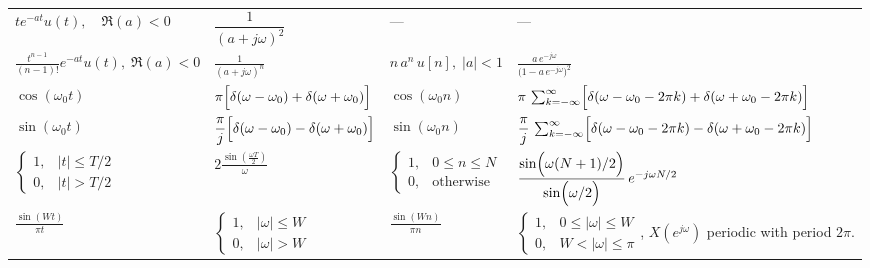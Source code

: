 \documentclass{article}
\begin{document}
\begin{multicols}{2}
\begin{table*}[ht]
\begin{tabular}{@{}llll@{}}
            $t e^{-at} u(t),\quad \Re(a)<0$                                & $\dfrac{1}{(a+j\omega)^2}$                                                    & ---                                                                     & ---                                                                                                                                 \\ [1mm]
            $\frac{t^{n-1}}{(n-1)!}e^{-a t}u(t),\;\Re(a)<0$                & $\frac{1}{(a + j\omega)^n}$                                                   & $n\,a^n\,u[n],\;|a|<1$                                                  & $\frac{a\,e^{-j\omega}}{\bigl(1 - a\,e^{-j\omega}\bigr)^2}$                                                                         \\ [1mm]
            $\cos(\omega_0 t)$                                             & $\pi\Bigl[\delta(\omega-\omega_0) + \delta(\omega+\omega_0)\Bigr]$            & $\cos(\omega_0 n)$                                                      & $\pi\,\sum_{k=-\infty}^{\infty}\Bigl[\delta(\omega-\omega_0-2\pi k) + \delta(\omega+\omega_0-2\pi k)\Bigr]$                         \\ [1mm]
            $\sin(\omega_0 t)$                                             & $\dfrac{\pi}{j}\Bigl[\delta(\omega-\omega_0) - \delta(\omega+\omega_0)\Bigr]$ & $\sin(\omega_0 n)$                                                      & $\dfrac{\pi}{j}\,\sum_{k=-\infty}^{\infty}\Bigl[\delta(\omega-\omega_0-2\pi k) - \delta(\omega+\omega_0-2\pi k)\Bigr]$              \\ [1mm]
            $\begin{cases} 1, & |t| \le T/2 \\ 0, & |t| > T/2 \end{cases}$ & $2\frac{\sin\left(\frac{\omega T}{2}\right)}{\omega}$                         & $\begin{cases} 1, & 0 \le n \le N \\ 0, & \text{otherwise} \end{cases}$ & $\dfrac{\sin\Bigl(\omega (N+1)/2\Bigr)}{\sin\Bigl(\omega/2\Bigr)}\,e^{-j\omega N/2}$                                                \\ [1mm]
            $\frac{\sin\left(Wt\right)}{\pi t}$                            & $\begin{cases} 1, & |\omega| \le W \\ 0, & |\omega| > W \end{cases}$          & $\frac{\sin\left(Wn\right)}{\pi n}$                                     & $\begin{cases} 1, & 0 \leq |\omega| \le W \\ 0, & W < |\omega| \leq \pi \end{cases}$, $X(e^{j\omega})$ periodic with period $2\pi$. \\ [1mm]
            \bottomrule
        \end{tabular}
    \end{table*}


\end{multicols}
\end{document}
